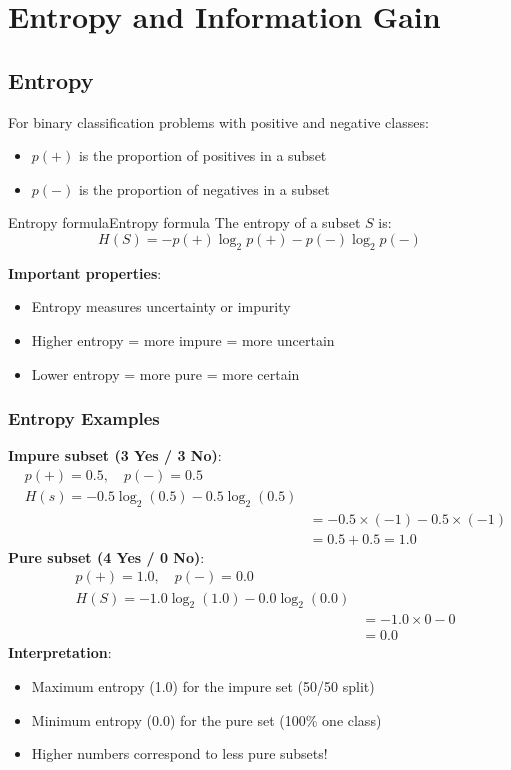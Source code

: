 \documentclass[a4paper]{article}
\theoremstyle{definition}
\begin{document}
\section{Entropy and Information Gain}
\subsection{Entropy}
For binary classification problems with positive and negative classes:
\begin{itemize}
    \item \( p(+) \) is the proportion of positives in a subset 
    \item \( p(-) \) is the proportion of negatives in a subset
\end{itemize}
\begin{definition}{Entropy formula}{Entropy formula}
The entropy of a subset \( S \) is:
\[
  H(S) = -p(+)\log_2p(+) - p(-)\log_2p(-)
\]
\end{definition}
\textbf{Important properties}:
\begin{itemize}
    \item Entropy measures uncertainty or impurity 
    \item Higher entropy = more impure = more uncertain 
    \item Lower entropy = more pure = more certain 
\end{itemize}
\subsubsection{Entropy Examples}
\textbf{Impure subset (3 Yes / 3 No)}:
\begin{align*}
    & p(+) = 0.5, \quad p(-) = 0.5 \\
    & H(s) = -0.5\log_2(0.5) - 0.5\log_2(0.5) \\
    & & = -0.5 \times (-1) - 0.5 \times (-1) \\
    & & = 0.5 + 0.5 = 1.0
\end{align*}
\textbf{Pure subset (4 Yes / 0 No)}:
\begin{align*}
    & p(+) = 1.0, \quad p(-) = 0.0 \\
    & H(S) = -1.0\log_2(1.0) - 0.0\log_2(0.0) \\
    & & = -1.0 \times 0 - 0 \\
    & & = 0.0
\end{align*}
\textbf{Interpretation}:
\begin{itemize}
    \item Maximum entropy (1.0) for the impure set (50/50 split)
    \item Minimum entropy (0.0) for the pure set (100\% one class)
    \item Higher numbers correspond to less pure subsets!
\end{itemize}
\end{document}
